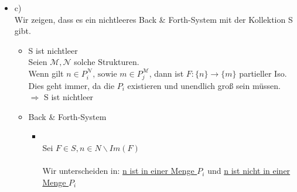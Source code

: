 \documentclass[a4paper]{scrartcl}%
\begin{document}
\begin{itemize}
\newpage

        \item c)\\
            Wir zeigen, dass es ein nichtleeres Back \& Forth-System mit der Kollektion S gibt.\\%
            
            \begin{itemize}
                \item S ist nichtleer\\
                    Seien $\mathcal{M}, \mathcal{N}$ solche Strukturen.\\
                    Wenn gilt $n \in P_i^\mathcal{N} \text{, sowie } m \in P_j^\mathcal{M}$, dann ist $F: \{n\} \rightarrow \{m\}$ partieller Iso.\\
                    Dies geht immer, da die $P_i$ existieren und unendlich groß sein müssen.\\
                    $\Rightarrow$ S ist nichtleer\\
                \item Back \& Forth-System\\
                    \begin{itemize}
                        \item {}\\
                            Sei $F \in S, n \in N\backslash Im(F)$\\
                            \\Wir unterscheiden in: \underline{n ist in einer Menge $P_i$} und \underline{n ist nicht in einer Menge $P_i$}\\
\end{itemize}
\end{itemize}
\end{itemize}
\end{document}
